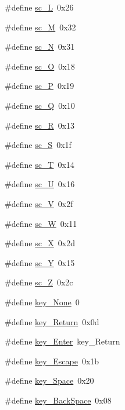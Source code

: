 \begin{DoxyCompactItemize}
\item 
\#define \hyperlink{ID__IN_8H_a725a7d6e5a62e1f49ecded96bc981ff0}{sc\_\-L}~0x26
\item 
\#define \hyperlink{ID__IN_8H_aa6807813ed691797c580a7388fe48ad5}{sc\_\-M}~0x32
\item 
\#define \hyperlink{ID__IN_8H_abd1526274fbcd0c55e47ffd865d94b18}{sc\_\-N}~0x31
\item 
\#define \hyperlink{ID__IN_8H_aa7e3a3caf36149fa839a60e18db142cc}{sc\_\-O}~0x18
\item 
\#define \hyperlink{ID__IN_8H_a1ce3a97277ff763aa0fbe0979d33be3c}{sc\_\-P}~0x19
\item 
\#define \hyperlink{ID__IN_8H_afe8214378d1239fb0eba7179bebf0e55}{sc\_\-Q}~0x10
\item 
\#define \hyperlink{ID__IN_8H_ab40938804ab9ce2755e8551b614aa86c}{sc\_\-R}~0x13
\item 
\#define \hyperlink{ID__IN_8H_a2962342701a1ab8dea2d702a4e3fb83d}{sc\_\-S}~0x1f
\item 
\#define \hyperlink{ID__IN_8H_a2defbfc4fff952b6856ec514e69170de}{sc\_\-T}~0x14
\item 
\#define \hyperlink{ID__IN_8H_ac26b829a509ce15f5fefa467620a9203}{sc\_\-U}~0x16
\item 
\#define \hyperlink{ID__IN_8H_ad8b27b1f0ed25cfa5034c871792d2108}{sc\_\-V}~0x2f
\item 
\#define \hyperlink{ID__IN_8H_ab01e4344a9484900a9eda32396636daf}{sc\_\-W}~0x11
\item 
\#define \hyperlink{ID__IN_8H_a304f258a8d166ad1d2209daf57fc4db3}{sc\_\-X}~0x2d
\item 
\#define \hyperlink{ID__IN_8H_a5f6c1e65d11139cad55c9235f7cc3825}{sc\_\-Y}~0x15
\item 
\#define \hyperlink{ID__IN_8H_abdfe2ea5cfd62dcfa591abdcaed59e6d}{sc\_\-Z}~0x2c
\item 
\#define \hyperlink{ID__IN_8H_a2b293229b86d509ca82f666e4fbccc7f}{key\_\-None}~0
\item 
\#define \hyperlink{ID__IN_8H_a138fecd408e102336ae02a971deed204}{key\_\-Return}~0x0d
\item 
\#define \hyperlink{ID__IN_8H_ac8d873cb1ee36ecc9a9f70124a0a6a92}{key\_\-Enter}~key\_\-Return
\item 
\#define \hyperlink{ID__IN_8H_a03c35e01517200de0899687b60766da6}{key\_\-Escape}~0x1b
\item 
\#define \hyperlink{ID__IN_8H_a87760aed21de5eed43b8144a68b43a18}{key\_\-Space}~0x20
\item 
\#define \hyperlink{ID__IN_8H_aa0a90f5d75fce7c8beb013538da152d1}{key\_\-BackSpace}~0x08

\end{DoxyCompactItemize}
